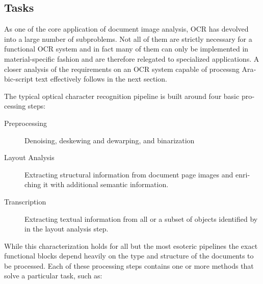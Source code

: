 \begin{french}
\subsection{Tasks}

As one of the core application of document image analysis, OCR has devolved
into a large number of subproblems. Not all of them are strictly necessary for
a functional OCR system and in fact many of them can only be implemented in
material-specific fashion and are therefore relegated to specialized
applications. A closer analysis of the requirements on an OCR system capable of
processng Arabic-script text effectively follows in the next section.

The typical optical character recognition pipeline is built around four basic
processing steps:

\begin{description}
\item [Preprocessing] Denoising, deskewing and dewarping, and binarization
\item [Layout Analysis] Extracting structural information from document page
images and enriching it with additional semantic information.
\item [Transcription] Extracting textual information from all or a subset of
objects identified by in the layout analysis step.
\end{description}

While this characterization holds for all but the most esoteric pipelines the
exact functional blocks depend heavily on the type and structure of the
documents to be processed. Each of these processing steps contains one or more
methods that solve a particular task, such as:


\end{french}
